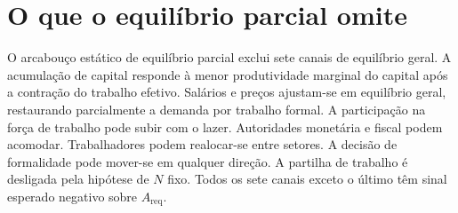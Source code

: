 \documentclass[12pt,a4paper]{article}
\begin{document}
\clearpage
\section{O que o equil\'ibrio parcial omite}\label{app:pe_omits}

O arcabou\c{c}o est\'atico de equil\'ibrio parcial exclui sete canais de equil\'ibrio geral. A acumula\c{c}\~ao de capital responde \`a menor produtividade marginal do capital ap\'os a contra\c{c}\~ao do trabalho efetivo. Sal\'arios e pre\c{c}os ajustam-se em equil\'ibrio geral, restaurando parcialmente a demanda por trabalho formal. A participa\c{c}\~ao na for\c{c}a de trabalho pode subir com o lazer. Autoridades monet\'aria e fiscal podem acomodar. Trabalhadores podem realocar-se entre setores. A decis\~ao de formalidade pode mover-se em qualquer dire\c{c}\~ao. A partilha de trabalho \'e desligada pela hip\'otese de $N$ fixo. Todos os sete canais exceto o \'ultimo t\^em sinal esperado negativo sobre $A_{\text{req}}$.
\end{document}
